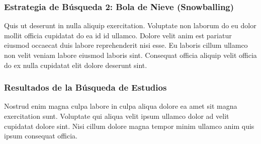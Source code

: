 \subsubsection{Estrategia de Búsqueda 2: Bola de Nieve (Snowballing)}
Quis ut deserunt in nulla aliquip exercitation. Voluptate non laborum do eu dolor mollit officia cupidatat do ea id id ullamco. Dolore velit anim est pariatur eiusmod occaecat duis labore reprehenderit nisi esse. Eu laboris cillum ullamco non velit veniam labore eiusmod laboris sint. Consequat officia aliquip velit officia do ex nulla cupidatat elit dolore deserunt sint.
\mbox{}\\

\subsubsection{Resultados de la Búsqueda de Estudios}
\label{subsubsec:resultados-busqueda}
Nostrud enim magna culpa labore in culpa aliqua dolore ea amet sit magna exercitation sunt. Voluptate qui aliqua velit ipsum ullamco dolor ad velit cupidatat dolore sint. Nisi cillum dolore magna tempor minim ullamco anim quis ipsum consequat officia.
\mbox{}\\